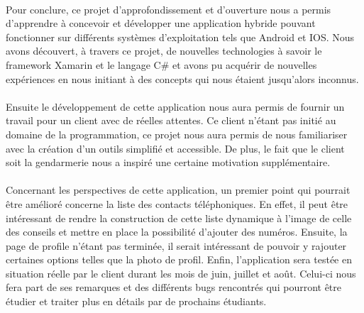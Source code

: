 \paragraph{}
	Pour conclure, ce projet d’approfondissement et d'ouverture nous a permis d'apprendre à concevoir et développer une application hybride pouvant fonctionner sur différents systèmes d'exploitation tels que Android et IOS. Nous avons découvert, à travers ce projet, de nouvelles technologies à savoir le framework Xamarin et le langage C\# et avons pu acquérir de nouvelles expériences en nous initiant à des concepts qui nous étaient jusqu'alors inconnus.
	
\paragraph{}
	 Ensuite le développement de cette application nous aura permis de fournir un travail pour un client avec de réelles attentes. Ce client n'étant pas initié au domaine de la programmation, ce projet nous aura permis de nous familiariser avec la création d'un outils simplifié et accessible. De plus, le fait que le client soit la gendarmerie nous a inspiré une certaine motivation supplémentaire.
	 
\paragraph{}
	Concernant les perspectives de cette application, un premier point qui pourrait être amélioré concerne la liste des contacts téléphoniques. En effet, il peut être intéressant de rendre la construction de cette liste dynamique à l'image de celle des conseils et mettre en place la possibilité d'ajouter des numéros. Ensuite, la page de profile n'étant pas terminée, il serait intéressant de pouvoir y rajouter certaines options telles que la photo de profil. Enfin, l'application sera testée en situation réelle par le client durant les mois de juin, juillet et août. Celui-ci nous fera part de ses remarques et des différents bugs rencontrés qui pourront être étudier et traiter plus en détails par de prochains étudiants.
